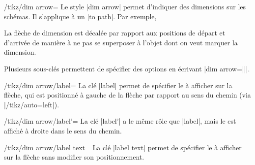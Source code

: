 \documentclass[a4paper]{ltxdoc}
\begin{document}
\begin{stylekey}{/tikz/dim arrow=}
  Le style |dim arrow| permet d'indiquer des dimensions sur les schémas. Il s'applique à un |to path|. Par exemple,

  \begin{codeexample}[width=4cm]
  \end{codeexample}

  La flèche de dimension est décalée par rapport aux positions de départ et d'arrivée de manière à ne pas se superposer
  à l'objet dont on veut marquer la dimension.

  Plusieurs sous-clés permettent de spécifier des options en écrivant |dim arrow={||}|.

  \begin{key}{/tikz/dim arrow/label=}
  La clé |label| permet de spécifier le  à afficher sur la flèche, qui est positionné à gauche de la flèche par rapport au sens du chemin (via |/tikz/auto=left|).
  \end{key}

  \begin{key}{/tikz/dim arrow/label'=}
  La clé |label'| a le même rôle que |label|, mais le  est affiché à droite dans le sens du chemin.
  \end{key}


\begin{codeexample}[]
\end{codeexample}

  \begin{key}{/tikz/dim arrow/label text=}
  La clé |label text| permet de spécifier le  à afficher sur la flèche sans modifier son positionnement.
  \end{key}


\end{stylekey}
\end{document}
